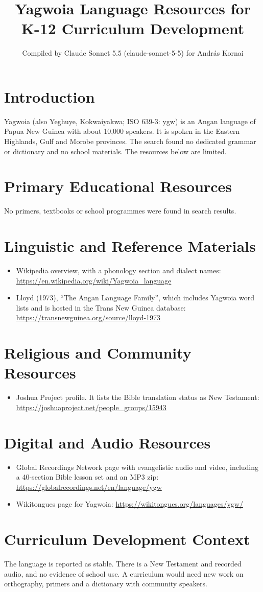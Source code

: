 \documentclass[12pt]{article}
\title{Yagwoia Language Resources for K-12 Curriculum Development}
\author{Compiled by Claude Sonnet 5.5 (claude-sonnet-5-5) for Andr\'as Kornai}
\date{}
\begin{document}
\maketitle

\section{Introduction}
Yagwoia (also Yeghuye, Kokwaiyakwa; ISO 639-3: ygw) is an Angan language of Papua New Guinea with about 10,000 speakers. It is spoken in the Eastern Highlands, Gulf and Morobe provinces. The search found no dedicated grammar or dictionary and no school materials. The resources below are limited.

\section{Primary Educational Resources}
No primers, textbooks or school programmes were found in search results.

\section{Linguistic and Reference Materials}
\begin{itemize}
\item Wikipedia overview, with a phonology section and dialect names: \url{https://en.wikipedia.org/wiki/Yagwoia_language}
\item Lloyd (1973), ``The Angan Language Family'', which includes Yagwoia word lists and is hosted in the Trans New Guinea database: \url{https://transnewguinea.org/source/lloyd-1973}
\end{itemize}

\section{Religious and Community Resources}
\begin{itemize}
\item Joshua Project profile. It lists the Bible translation status as New Testament: \url{https://joshuaproject.net/people_groups/15943}
\end{itemize}

\section{Digital and Audio Resources}
\begin{itemize}
\item Global Recordings Network page with evangelistic audio and video, including a 40-section Bible lesson set and an MP3 zip: \url{https://globalrecordings.net/en/language/ygw}
\item Wikitongues page for Yagwoia: \url{https://wikitongues.org/languages/ygw/}
\end{itemize}

\section{Curriculum Development Context}
The language is reported as stable. There is a New Testament and recorded audio, and no evidence of school use. A curriculum would need new work on orthography, primers and a dictionary with community speakers.
\end{document}
